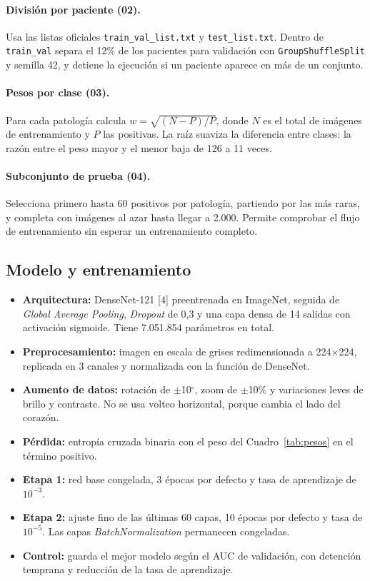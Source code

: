 \documentclass[11.5pt]{article}
\begin{document}
\paragraph{División por paciente (02).} Usa las listas oficiales \texttt{train\_val\_list.txt} y \texttt{test\_list.txt}. Dentro de \texttt{train\_val} separa el 12\% de los pacientes para validación con \texttt{GroupShuffleSplit} y semilla 42, y detiene la ejecución si un paciente aparece en más de un conjunto.

\paragraph{Pesos por clase (03).} Para cada patología calcula $w = \sqrt{(N-P)/P}$, donde $N$ es el total de imágenes de entrenamiento y $P$ las positivas. La raíz suaviza la diferencia entre clases: la razón entre el peso mayor y el menor baja de 126 a 11 veces.

\paragraph{Subconjunto de prueba (04).} Selecciona primero hasta 60 positivos por patología, partiendo por las más raras, y completa con imágenes al azar hasta llegar a 2.000. Permite comprobar el flujo de entrenamiento sin esperar un entrenamiento completo.

\subsection{Modelo y entrenamiento}

\begin{itemize}
    \item \textbf{Arquitectura:} DenseNet-121 [4] preentrenada en ImageNet, seguida de \textit{Global Average Pooling}, \textit{Dropout} de 0,3 y una capa densa de 14 salidas con activación sigmoide. Tiene 7.051.854 parámetros en total.
    \item \textbf{Preprocesamiento:} imagen en escala de grises redimensionada a 224$\times$224, replicada en 3 canales y normalizada con la función de DenseNet.
    \item \textbf{Aumento de datos:} rotación de $\pm$10$^\circ$, zoom de $\pm$10\% y variaciones leves de brillo y contraste. No se usa volteo horizontal, porque cambia el lado del corazón.
    \item \textbf{Pérdida:} entropía cruzada binaria con el peso del Cuadro~\ref{tab:pesos} en el término positivo.
    \item \textbf{Etapa 1:} red base congelada, 3 épocas por defecto y tasa de aprendizaje de $10^{-3}$.
    \item \textbf{Etapa 2:} ajuste fino de las últimas 60 capas, 10 épocas por defecto y tasa de $10^{-5}$. Las capas \textit{BatchNormalization} permanecen congeladas.
    \item \textbf{Control:} guarda el mejor modelo según el AUC de validación, con detención temprana y reducción de la tasa de aprendizaje.
\end{itemize}
\end{document}
